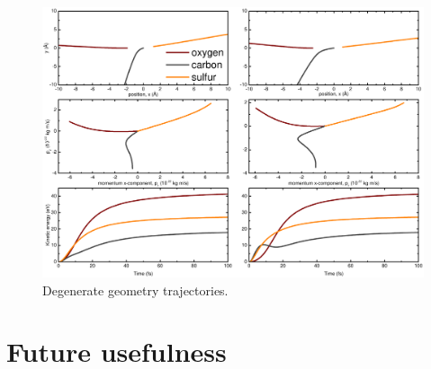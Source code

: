 \begin{figure}
  \centering
  \includegraphics[width=\textwidth]{Plots/DegenerateGeometryTrajectories.pdf}
  \caption[Degenerate geometry trajectories.]
  {Degenerate geometry trajectories.}
  \label{fig:DegenerateGeometryTrajectories}
\end{figure}
\clearpage

\section{Future usefulness}

